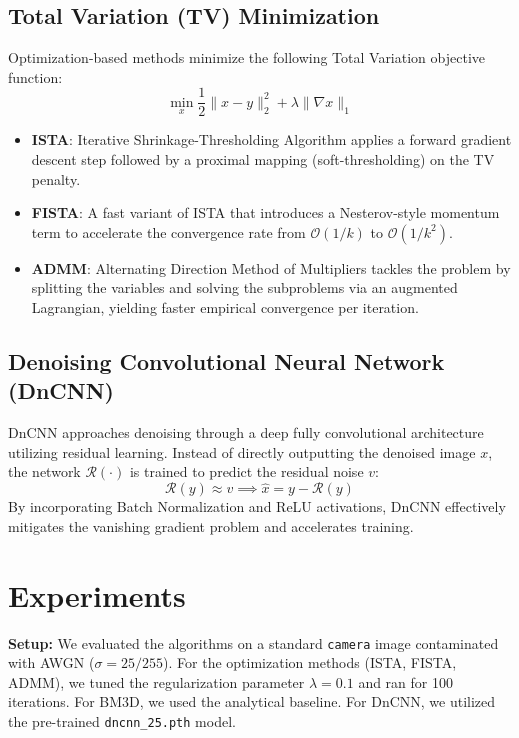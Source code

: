 \subsection{Total Variation (TV) Minimization}
Optimization-based methods minimize the following Total Variation objective function:
\begin{equation}
\min_x \frac{1}{2}\|x-y\|_2^2 + \lambda \|\nabla x\|_1
\end{equation}
\begin{itemize}
    \item \textbf{ISTA}: Iterative Shrinkage-Thresholding Algorithm applies a forward gradient descent step followed by a proximal mapping (soft-thresholding) on the TV penalty.
    \item \textbf{FISTA}: A fast variant of ISTA that introduces a Nesterov-style momentum term to accelerate the convergence rate from $\mathcal{O}(1/k)$ to $\mathcal{O}(1/k^2)$.
    \item \textbf{ADMM}: Alternating Direction Method of Multipliers tackles the problem by splitting the variables and solving the subproblems via an augmented Lagrangian, yielding faster empirical convergence per iteration.
\end{itemize}

\subsection{Denoising Convolutional Neural Network (DnCNN)}
DnCNN approaches denoising through a deep fully convolutional architecture utilizing residual learning. Instead of directly outputting the denoised image $x$, the network $\mathcal{R}(\cdot)$ is trained to predict the residual noise $v$:
\begin{equation}
\mathcal{R}(y) \approx v \implies \hat{x} = y - \mathcal{R}(y)
\end{equation}
By incorporating Batch Normalization and ReLU activations, DnCNN effectively mitigates the vanishing gradient problem and accelerates training.

\section{Experiments}
\textbf{Setup:} We evaluated the algorithms on a standard \texttt{camera} image contaminated with AWGN ($\sigma = 25/255$). For the optimization methods (ISTA, FISTA, ADMM), we tuned the regularization parameter $\lambda=0.1$ and ran for 100 iterations. For BM3D, we used the analytical baseline. For DnCNN, we utilized the pre-trained \texttt{dncnn\_25.pth} model. 

